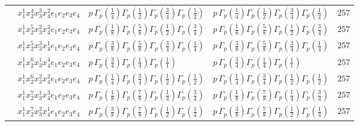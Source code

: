 \documentclass[11pt]{article}
\begin{document}
\begin{table}[ht]
{\begin{tabular}{@{}lllll@{}}
 & $x_{1}^{1} x_{2}^{4} x_{3}^{3} x_{4}^{2}  e_{1} e_{2} e_{3} e_{4}$ & $p \, \Gamma_p \left( \frac{1}{4} \right) \Gamma_p \left( \frac{1}{2} \right) \Gamma_p \left( \frac{3}{4} \right) \Gamma_p \left( \frac{1}{2} \right)$ & $p \, \Gamma_p \left( \frac{1}{4} \right) \Gamma_p \left( \frac{1}{2} \right) \Gamma_p \left( \frac{3}{4} \right) \Gamma_p \left( \frac{1}{2} \right)$ & $257$ \\
 & $x_{1}^{1} x_{2}^{5} x_{3}^{2} x_{4}^{3}  e_{1} e_{2} e_{3} e_{4}$ & $p \, \Gamma_p \left( \frac{1}{8} \right) \Gamma_p \left( \frac{5}{8} \right) \Gamma_p \left( \frac{1}{2} \right) \Gamma_p \left( \frac{3}{4} \right)$ & $p \, \Gamma_p \left( \frac{1}{8} \right) \Gamma_p \left( \frac{5}{8} \right) \Gamma_p \left( \frac{1}{2} \right) \Gamma_p \left( \frac{3}{4} \right)$ & $257$ \\
 & $x_{1}^{1} x_{2}^{5} x_{3}^{3} x_{4}^{1}  e_{1} e_{2} e_{3} e_{4}$ & $p \, \Gamma_p \left( \frac{3}{8} \right) \Gamma_p \left( \frac{5}{8} \right) \Gamma_p \left( \frac{3}{4} \right) \Gamma_p \left( \frac{1}{4} \right)$ & $p \, \Gamma_p \left( \frac{3}{8} \right) \Gamma_p \left( \frac{5}{8} \right) \Gamma_p \left( \frac{3}{4} \right) \Gamma_p \left( \frac{1}{4} \right)$ & $257$ \\
 & $x_{1}^{1} x_{2}^{6} x_{3}^{1} x_{4}^{4}  e_{1} e_{2} e_{3} e_{4}$ & $p \, \Gamma_p \left( \frac{3}{4} \right) \Gamma_p \left( \frac{1}{4} \right) \Gamma_p \left( \frac{1}{1} \right)$ & $p \, \Gamma_p \left( \frac{3}{4} \right) \Gamma_p \left( \frac{1}{4} \right) \Gamma_p \left( \frac{1}{1} \right)$ & $257$ \\
 & $x_{1}^{1} x_{2}^{6} x_{3}^{2} x_{4}^{2}  e_{1} e_{2} e_{3} e_{4}$ & $p \, \Gamma_p \left( \frac{1}{4} \right) \Gamma_p \left( \frac{3}{4} \right) \Gamma_p \left( \frac{1}{2} \right) \Gamma_p \left( \frac{1}{2} \right)$ & $p \, \Gamma_p \left( \frac{1}{4} \right) \Gamma_p \left( \frac{3}{4} \right) \Gamma_p \left( \frac{1}{2} \right) \Gamma_p \left( \frac{1}{2} \right)$ & $257$ \\
 & $x_{1}^{1} x_{2}^{7} x_{3}^{1} x_{4}^{3}  e_{1} e_{2} e_{3} e_{4}$ & $p \, \Gamma_p \left( \frac{1}{8} \right) \Gamma_p \left( \frac{7}{8} \right) \Gamma_p \left( \frac{1}{4} \right) \Gamma_p \left( \frac{3}{4} \right)$ & $p \, \Gamma_p \left( \frac{1}{8} \right) \Gamma_p \left( \frac{7}{8} \right) \Gamma_p \left( \frac{1}{4} \right) \Gamma_p \left( \frac{3}{4} \right)$ & $257$ \\
 & $x_{1}^{1} x_{2}^{7} x_{3}^{2} x_{4}^{1}  e_{1} e_{2} e_{3} e_{4}$ & $p \, \Gamma_p \left( \frac{3}{8} \right) \Gamma_p \left( \frac{7}{8} \right) \Gamma_p \left( \frac{1}{2} \right) \Gamma_p \left( \frac{1}{4} \right)$ & $p \, \Gamma_p \left( \frac{3}{8} \right) \Gamma_p \left( \frac{7}{8} \right) \Gamma_p \left( \frac{1}{2} \right) \Gamma_p \left( \frac{1}{4} \right)$ & $257$ \\

\end{tabular}}
\end{table}
\end{document}
